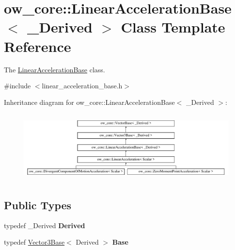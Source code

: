 \hypertarget{classow__core_1_1LinearAccelerationBase}{}\section{ow\+\_\+core\+:\+:Linear\+Acceleration\+Base$<$ \+\_\+\+Derived $>$ Class Template Reference}
\label{classow__core_1_1LinearAccelerationBase}


The \hyperlink{classow__core_1_1LinearAccelerationBase}{Linear\+Acceleration\+Base} class.  




{\ttfamily \#include $<$linear\+\_\+acceleration\+\_\+base.\+h$>$}

Inheritance diagram for ow\+\_\+core\+:\+:Linear\+Acceleration\+Base$<$ \+\_\+\+Derived $>$\+:\begin{figure}[H]
\begin{center}
\leavevmode
\includegraphics[height=3.703704cm]{d3/dc9/classow__core_1_1LinearAccelerationBase}
\end{center}
\end{figure}
\subsection*{Public Types}
\begin{DoxyCompactItemize}
\item 
typedef \+\_\+\+Derived {\bfseries Derived}\hypertarget{classow__core_1_1LinearAccelerationBase_a46ce8d6b5ba659bf0a5216778ab7ea1e}{}\label{classow__core_1_1LinearAccelerationBase_a46ce8d6b5ba659bf0a5216778ab7ea1e}

\item 
typedef \hyperlink{classow__core_1_1Vector3Base}{Vector3\+Base}$<$ Derived $>$ {\bfseries Base}\hypertarget{classow__core_1_1LinearAccelerationBase_a29bea6dd44f422fd5e7307fd5ff7cc8c}{}\label{classow__core_1_1LinearAccelerationBase_a29bea6dd44f422fd5e7307fd5ff7cc8c}

\end{DoxyCompactItemize}
